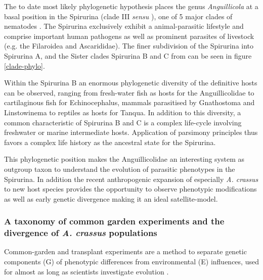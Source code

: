 The to date most likely phylogenetic hypothesis places the genus
\textit{Anguillicola} at a basal position in the Spirurina (clade III
\textit{sensu} \cite{blaxter_molecular_1998}), one of 5 major clades
of nematodes \cite{nadler_molecular_2007,
  wijov_evolutionary_2006}. The Spirurina exclusively exhibit a
animal-parasitic lifestyle and comprise important human pathogens as
well as prominent parasites of livestock (e.g. the Filaroidea and
Ascarididae). The finer subdivision of the Spirurina into Spirurina A,
and the Sister clades Spirurina B and C from \cite{dl_py} can be seen
in figure \ref{clade-phylo}.


Within the Spirurina B an enormous phylogenetic diversity of the
definitive hosts can be observed, ranging from fresh-water fish as
hosts for the Anguillicolidae to cartilaginous fish for
Echinocephalus, mammals parasitised by Gnathostoma and Linstowinema to
reptiles as hosts for Tanqua. In addition to this diversity, a common
characteristic of Spirurina B and C is a complex life-cycle involving
freshwater or marine intermediate hosts. Application of parsimony
principles thus favors a complex life history as the ancestral state
for the Spirurina.

This phylogenetic position makes the Anguillicolidae an interesting
system as outgroup taxon to understand the evolution of parasitic
phenotypes in the Spirurina. In addition the recent anthropogenic
expansion of especially \textit{A. crassus} to new host species
provides the opportunity to observe phenotypic modifications as well
as early genetic divergence making it an ideal satellite-model.

\subsubsection{A taxonomy of common garden experiments and the
  divergence of \textit{A. crassus} populations}
\label{div-ac}

Common-garden and transplant experiments are a method to separate
genetic components (G) of phenotypic differences from environmental
(E) influences, used for almost as long as scientists investigate
evolution \cite{kerner_classic_common_garden,
  bonnier_classic_common_garden}.

